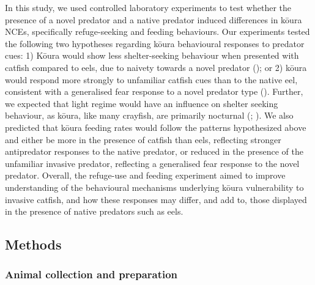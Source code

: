 \documentclass[
  letterpaper,
  DIV=11,
  numbers=noendperiod]{scrartcl}
\begin{document}
In this study, we used controlled laboratory experiments to test whether
the presence of a novel predator and a native predator induced
differences in kōura NCEs, specifically refuge-seeking and feeding
behaviours. Our experiments tested the following two hypotheses
regarding kōura behavioural responses to predator cues: 1) Kōura would
show less shelter-seeking behaviour when presented with catfish compared
to eels, due to naivety towards a novel predator
(); or 2) kōura would
respond more strongly to unfamiliar catfish cues than to the native eel,
consistent with a generalised fear response to a novel predator type
(). Further, we expected that
light regime would have an influence on shelter seeking behaviour, as
kōura, like many crayfish, are primarily nocturnal
(;
). We also predicted that
kōura feeding rates would follow the patterns hypothesized above and
either be more in the presence of catfish than eels, reflecting stronger
antipredator responses to the native predator, or reduced in the
presence of the unfamiliar invasive predator, reflecting a generalised
fear response to the novel predator. Overall, the refuge-use and feeding
experiment aimed to improve understanding of the behavioural mechanisms
underlying kōura vulnerability to invasive catfish, and how these
responses may differ, and add to, those displayed in the presence of
native predators such as eels.

\subsection{Methods}\label{methods}

\subsubsection{Animal collection and
preparation}\label{animal-collection-and-preparation}
\end{document}
